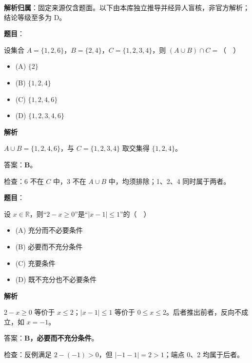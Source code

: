 

\begin{gknotice}
\textbf{解析归属}：固定来源仅含题面。以下由本库独立推导并经异人盲核，非官方解析；结论等级至多为 D。
\end{gknotice}

\begin{answer}

\textbf{题目}：

设集合 $A=\{1,2,6\}$，$B=\{2,4\}$，$C=\{1,2,3,4\}$，则 $(A\cup B)\cap C=$（　）

\begin{itemize}
\item (A) $\{2\}$
\item (B) $\{1,2,4\}$
\item (C) $\{1,2,4,6\}$
\item (D) $\{1,2,3,4,6\}$
\end{itemize}

\textbf{解析}

$A\cup B=\{1,2,4,6\}$，与 $C=\{1,2,3,4\}$ 取交集得 $\{1,2,4\}$。

答案：\textbf{B}。

检查：6 不在 $C$ 中，3 不在 $A\cup B$ 中，均须排除；1、2、4 同时属于两者。


\end{answer}
\begin{answer}

\textbf{题目}：

设 $x\in\mathbb R$，则“$2-x\geqslant0$”是“$|x-1|\leqslant1$”的（　）

\begin{itemize}
\item (A) 充分而不必要条件
\item (B) 必要而不充分条件
\item (C) 充要条件
\item (D) 既不充分也不必要条件
\end{itemize}

\textbf{解析}

$2-x\geqslant0$ 等价于 $x\leqslant2$；$|x-1|\leqslant1$ 等价于 $0\leqslant x\leqslant2$。后者推出前者，反向不成立，如 $x=-1$。

答案：\textbf{B，必要而不充分条件}。

检查：反例满足 $2-(-1)>0$，但 $|-1-1|=2>1$；端点 0、2 均属于后者。


\end{answer}
